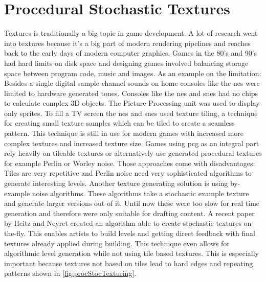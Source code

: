 \documentclass[10pt,a4paper]{article}
\begin{document}
\section{Procedural Stochastic Textures}
\begin{multicols}{2}
Textures is traditionally a big topic in game development. A lot of research went into textures because it’s a big part of modern rendering pipelines and reaches back to the early days of modern computer graphics. Games in the 80’s and 90’s had hard limits on disk space\cite{Ferrari2016} and designing games involved balancing storage space between program code, music and images. As an example on the limitation: Besides a single digital sample channel sounds on home consoles like the \gls{nes} were limited to hardware generated tones\cite{wiki:NintendoEntertainmentSystem}. Consoles like the \gls{nes} and \gls{snes} had no chips to calculate complex 3D objects. The Picture Processing unit was used to display only sprites. To fill a TV screen the \gls{nes} and \gls{snes} used texture tiling, a technique for creating small texture samples which can be tiled to create a seamless pattern. This technique is still in use for modern games with increased more complex textures and increased texture size. Games using \gls{pcg} as an integral part rely heavily on tileable textures or alternatively use generated procedural textures for example Perlin\cite{perlin1985image} or Worley\cite{worley1996cellular} noise. Those approaches come with disadvantages: Tiles are very repetitive and Perlin noise need very sophisticated algorithms to generate interesting levels. Another texture generating solution is using by-example noise algorithms. These algorithms take a stochastic example texture and generate larger versions out of it. Until now these were too slow for real time generation and therefore were only suitable for drafting content. A recent paper by Heitz and Neyret created an algorithm able to create stochastic textures on-the-fly\cite{Heitz2018}. This enables artists to build levels and getting direct feedback with final textures already applied during building. This technique even allows for algorithmic level generation while not using tile based textures. This is especially important because textures not based on tiles lead to hard edges and repeating patterns shown in \autoref{fig:procStocTexturing}.
\end{multicols}
\end{document}
